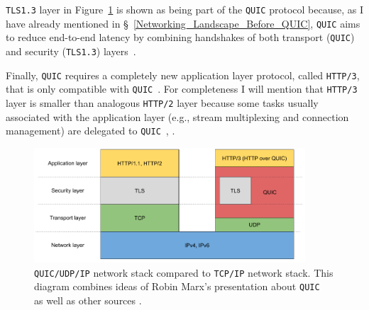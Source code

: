 \documentclass[12pt,a4paper]{report}
\begin{document}
\texttt{TLS1.3} layer in Figure~\ref{fig:QUIC_network_stack} is shown as being part of the \texttt{QUIC} protocol because, as I have already mentioned in \S~\ref{Networking_Landscape_Before_QUIC},  \texttt{QUIC} aims to reduce end-to-end latency by combining handshakes of both transport (\texttt{QUIC}) and security (\texttt{TLS1.3}) layers~\cite{Google_QUIC_protocol_moving_the_web_from_TCP_to_UDP, HTTP_3_the_past_the_present_and_the_future}.

Finally, \texttt{QUIC} requires a completely new application layer protocol, called \texttt{HTTP/3}, that is only compatible with \texttt{QUIC}~\cite{head-of-line-blocking-in-quic-and-http-3-the-details}.
For completeness I will mention that \texttt{HTTP/3} layer is smaller than analogous \texttt{HTTP/2} layer because some tasks usually associated with the application layer (e.g., stream multiplexing and connection management) are delegated to \texttt{QUIC}~\cite{bib_grigorik2013}, \cite[Chapter 12]{Google_QUIC_protocol_moving_the_web_from_TCP_to_UDP}.



    \begin{figure}[ht]
    \centering
    \includegraphics[width=0.9\textwidth]{figs/Layers_in_the_protocol_stack.png}
    \caption[\texttt{QUIC/UDP/IP} network stack compared to \texttt{TCP/IP} network stack]{\texttt{QUIC/UDP/IP} network stack compared to \texttt{TCP/IP} network stack. This diagram combines ideas of Robin Marx's presentation about \texttt{QUIC}~\cite{head-of-line-blocking-in-quic-and-http-3-the-details} as well as other sources \cite{overview_of_the_QUIC_protocol, IETF_presentation_about_QUIC, HTTP_3_the_past_the_present_and_the_future}.
    }
    \label{fig:QUIC_network_stack}
    \end{figure}
\end{document}
